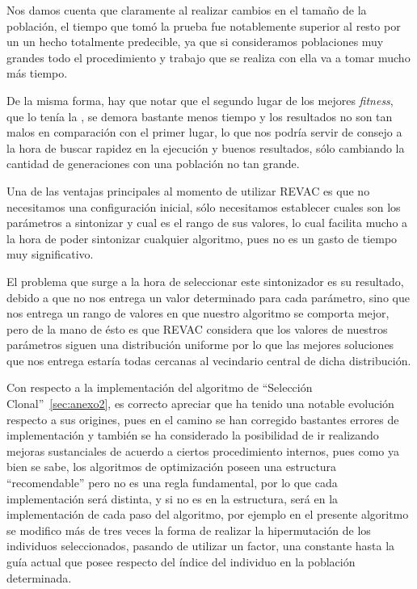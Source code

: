 Nos damos cuenta que claramente al realizar cambios en el tamaño de la población, el tiempo que tomó la prueba fue
notablemente superior al resto por un un hecho totalmente predecible, ya que si consideramos poblaciones muy grandes
todo el procedimiento y trabajo que se realiza con ella va a tomar mucho más tiempo.

De la misma forma, hay que notar que el segundo lugar de los mejores \emph{fitness}, que lo tenía la ,
se demora bastante menos tiempo y los resultados no son tan malos en comparación con el primer lugar, lo que nos podría
servir de consejo a la hora de buscar rapidez en la ejecución y buenos resultados, sólo cambiando la cantidad de generaciones
con una población no tan grande.


Una de las ventajas principales al momento de utilizar REVAC es que no necesitamos una configuración inicial,
sólo necesitamos establecer cuales son los parámetros a sintonizar y cual es el rango de sus valores, lo cual
facilita mucho a la hora de poder sintonizar cualquier algoritmo, pues no es un gasto de tiempo muy significativo.

El problema que surge a la hora de seleccionar este sintonizador es su resultado, debido a que no nos entrega
un valor determinado para cada parámetro, sino que nos entrega un rango de valores en que nuestro algoritmo se comporta mejor,
pero de la mano de ésto es que REVAC considera que los valores de nuestros parámetros siguen una distribución uniforme
por lo que las mejores soluciones que nos entrega estaría todas cercanas al vecindario central de dicha distribución.

Con respecto a la implementación del algoritmo de ``Selección Clonal''~\ref{sec:anexo2}, es correcto apreciar que ha tenido una notable
evolución respecto a sus origines, pues en el camino se han corregido bastantes errores de implementación y también
se ha considerado la posibilidad de ir realizando mejoras sustanciales de acuerdo a ciertos procedimiento internos,
pues como ya bien se sabe, los algoritmos de optimización poseen una estructura ``recomendable'' pero no es una regla
fundamental, por lo que cada implementación será distinta, y si no es en la estructura, será en la implementación de cada
paso del algoritmo, por ejemplo en el presente algoritmo se modifico más de tres veces la forma de realizar la hipermutación
de los individuos seleccionados, pasando de utilizar un factor, una constante hasta la guía actual que posee respecto
del índice del individuo en la población determinada.

